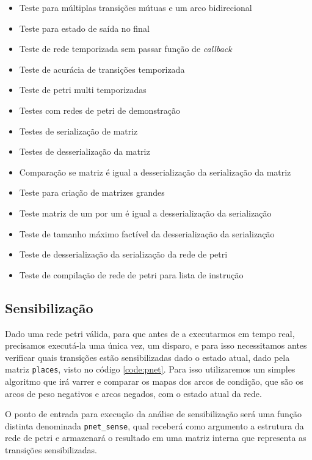 \begin{itemize}
	\item Teste para múltiplas transições mútuas e um arco bidirecional
	\item Teste para estado de saída no final
	\item Teste de rede temporizada sem passar função de \textit{callback}
	\item Teste de acurácia de transições temporizada
	\item Teste de petri multi temporizadas
	\item Testes com redes de petri de demonstração
	\item Testes de serialização de matriz
	\item Testes de desserialização da matriz
	\item Comparação se matriz é igual a desserialização da serialização da matriz
	\item Teste para criação de matrizes grandes
	\item Teste matriz de um por um é igual a desserialização da serialização
	\item Teste de tamanho máximo factível da desserialização da serialização
	\item Teste de desserialização da serialização da rede de petri
	\item Teste de compilação de rede de petri para lista de instrução
\end{itemize}

\subsection{Sensibilização}

Dado uma rede petri válida, para que antes de a executarmos em tempo real, precisamos executá-la uma única vez, um disparo, e para isso necessitamos antes verificar quais transições estão sensibilizadas dado o estado atual, dado pela matriz \lstinline{places}, visto no código \ref{code:pnet}. Para isso utilizaremos um simples algoritmo que irá varrer e comparar os mapas dos arcos de condição, que são os arcos de peso negativos e arcos negados, com o estado atual da rede.

O ponto de entrada para execução da análise de sensibilização será uma função distinta denominada \lstinline{pnet_sense}, qual receberá como argumento a estrutura da rede de petri e armazenará o resultado em uma matriz interna que representa as transições sensibilizadas.



